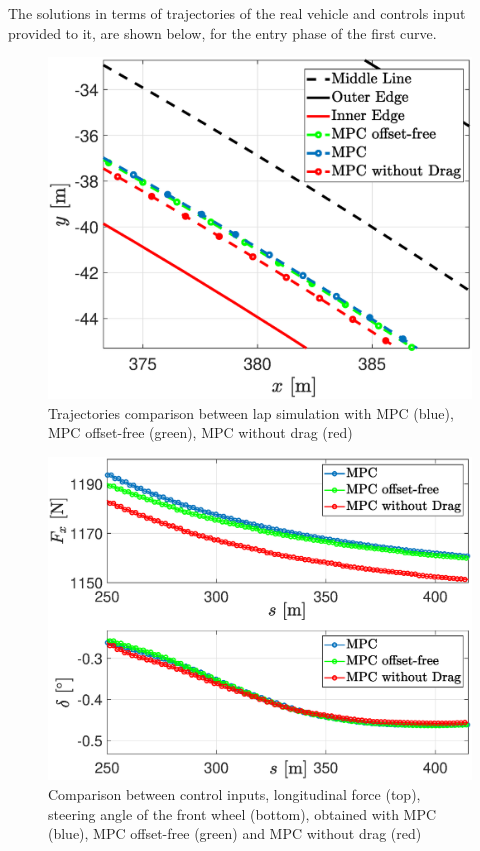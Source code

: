 \documentclass[conference]{IEEEtran} %
\begin{document}
The solutions in terms of trajectories of the real vehicle and controls input provided to it, are shown below, for the entry phase of the first curve. 

\begin{figure}[htb] \centering
    \includegraphics[width=1.\linewidth]{Trajectories2}
	\caption{Trajectories comparison between lap simulation with MPC (blue), MPC offset-free (green), MPC without drag (red)}
	\label{fig:Trajectories2}
\end{figure}

\begin{figure}[htb] \centering
	\includegraphics[width=1.\linewidth]{steer_fx}
	\caption{Comparison between control inputs, longitudinal force (top), steering angle of the front wheel (bottom), obtained with MPC (blue), MPC offset-free (green) and MPC without drag (red)}
	\label{fig:steer_fx}
\end{figure}
\end{document}
